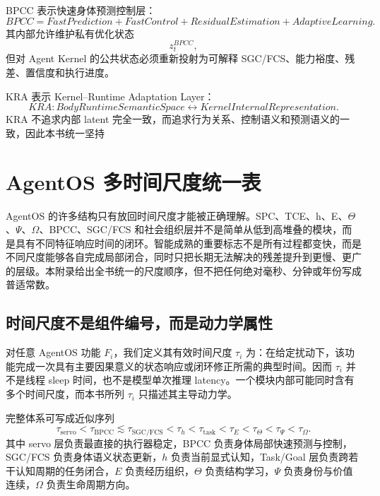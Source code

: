 BPCC 表示快速身体预测控制层：
\[
BPCC
=
FastPrediction
+
FastControl
+
ResidualEstimation
+
AdaptiveLearning.
\]
其内部允许维护私有优化状态
\[
z_t^{BPCC},
\]
但对 Agent Kernel 的公共状态必须重新投射为可解释 SGC/FCS、能力裕度、残差、置信度和执行进度。

KRA 表示 Kernel--Runtime Adaptation Layer：
\[
KRA:
BodyRuntimeSemanticSpace
\leftrightarrow
KernelInternalRepresentation.
\]
KRA 不追求内部 latent 完全一致，而追求行为关系、控制语义和预测语义的一致，因此本书统一坚持
\begin{statementbox}
\centering
{}
\end{statementbox}


\chapter{AgentOS 多时间尺度统一表}
\label{app:timescale}

\begin{chapterlead}
AgentOS 的许多结构只有放回时间尺度才能被正确理解。SPC、TCE、h、E、$\Theta$、$\Psi$、$\Omega$、BPCC、SGC/FCS 和社会组织层并不是简单从低到高堆叠的模块，而是具有不同特征响应时间的闭环。智能成熟的重要标志不是所有过程都变快，而是不同尺度能够各自完成局部闭合，同时只把长期无法解决的残差提升到更慢、更广的层级。本附录给出全书统一的尺度顺序，但不把任何绝对毫秒、分钟或年份写成普适常数。
\end{chapterlead}

\section{时间尺度不是组件编号，而是动力学属性}

对任意 AgentOS 功能 $F_i$，我们定义其有效时间尺度 $\tau_i$ 为：在给定扰动下，该功能完成一次具有主要因果意义的状态响应或闭环修正所需的典型时间。因而 $\tau_i$ 并不是线程 sleep 时间，也不是模型单次推理 latency。一个模块内部可能同时含有多个时间尺度，而本书所列 $\tau_i$ 只描述其主导动力学。

完整体系可写成近似序列
\[
\tau_{\mathrm{servo}}
<
\tau_{\mathrm{BPCC}}
\lesssim
\tau_{\mathrm{SGC/FCS}}
<
\tau_h
<
\tau_{\mathrm{task}}
<
\tau_E
<
\tau_\Theta
<
\tau_{\Psi}
<
\tau_{\Omega}.
\]
其中 servo 层负责最直接的执行器稳定，BPCC 负责身体局部快速预测与控制，SGC/FCS 负责身体语义状态更新，$h$ 负责当前显式认知，Task/Goal 层负责跨若干认知周期的任务闭合，$E$ 负责经历组织，$\Theta$ 负责结构学习，$\Psi$ 负责身份与价值连续，$\Omega$ 负责生命周期方向。

